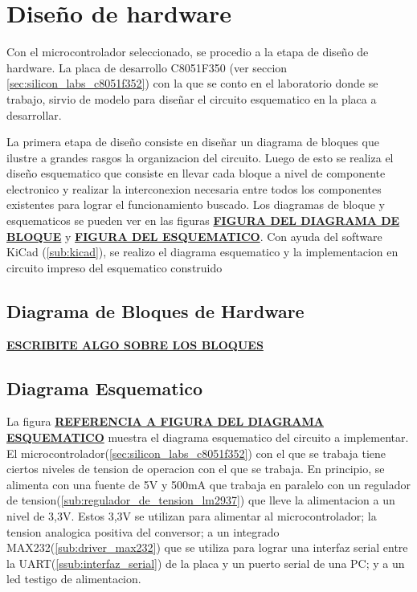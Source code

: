 \section{Dise\~no de hardware} %
\label{sec:diseno_de_hardware}


Con el microcontrolador seleccionado, se procedio a la etapa de dise\~no de hardware. La placa de desarrollo C8051F350 (ver seccion \ref{sec:silicon_labs_c8051f352}) con la que se conto en el laboratorio donde se trabajo, sirvio de modelo para dise\~nar el circuito esquematico en la placa a desarrollar.

La primera etapa de dise\~no consiste en dise\~nar un diagrama de bloques que ilustre a grandes rasgos la organizacion del circuito. Luego de esto se realiza el dise\~no esquematico que consiste en llevar cada bloque a nivel de componente electronico y realizar la interconexion necesaria entre todos los componentes existentes para lograr el funcionamiento buscado. Los diagramas de bloque y esquematicos se pueden ver en las figuras \underline{\textbf{FIGURA DEL DIAGRAMA DE BLOQUE}} y \underline{\textbf{FIGURA DEL ESQUEMATICO}}. Con ayuda del software KiCad (\ref{sub:kicad}), se realizo el diagrama esquematico y la implementacion en circuito impreso del esquematico construido

\subsection{Diagrama de Bloques de Hardware} %
\label{sub:diagrama_de_bloques_de_hardware}

\textbf{\underline{ESCRIBITE ALGO SOBRE LOS BLOQUES}}




\subsection{Diagrama Esquematico} %
\label{sub:diagrama_esquematico}

La figura \textbf{\underline{REFERENCIA A FIGURA DEL DIAGRAMA ESQUEMATICO}} muestra el diagrama esquematico del circuito a implementar. El microcontrolador(\ref{sec:silicon_labs_c8051f352}) con el que se trabaja tiene ciertos niveles de tension de operacion con el que se trabaja. En principio, se alimenta con una fuente de 5V y 500mA que trabaja en paralelo con un regulador de tension(\ref{sub:regulador_de_tension_lm2937}) que lleve la alimentacion a un nivel de 3,3V. Estos 3,3V se utilizan para alimentar al microcontrolador; la tension analogica positiva del conversor; a un integrado MAX232(\ref{sub:driver_max232}) que se utiliza para lograr una interfaz serial entre la UART(\ref{ssub:interfaz_serial}) de la placa y un puerto serial de una PC; y a un led testigo de alimentacion.


